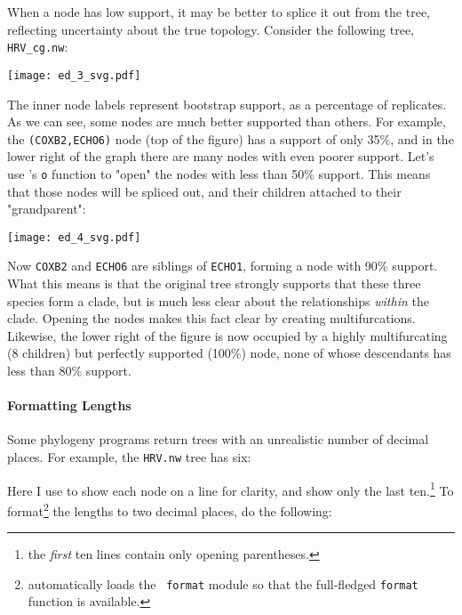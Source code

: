 When a node has low support, it may be better to splice it out from the tree,
reflecting uncertainty about the true topology. Consider the following tree, 
\texttt{HRV\_cg.nw}:

\begin{center}
\texttt{[image: ed\_3\_svg.pdf]}
\end{center}

\noindent{}The inner node labels represent bootstrap support, as a percentage of
replicates. As we can see, some nodes are much better supported than others.
For example, the \texttt{(COXB2,ECHO6)} node (top of the figure) has a support
of only 35\%, and in the lower right of the graph there are many nodes with even
poorer support. Let's use \luaed's \texttt{o} function to "open" the nodes with
less than 50\% support. This means that those nodes will be spliced out, and
their children attached to their "grandparent":


\begin{center}
\texttt{[image: ed\_4\_svg.pdf]}
\end{center}

\noindent{}Now \texttt{COXB2} and \texttt{ECHO6} are siblings of
\texttt{ECHO1}, forming a node with 90\% support. What this means is that the
original tree strongly supports that these three species form a clade, but is
much less clear about the relationships \emph{within} the clade. Opening the
nodes makes this fact clear by creating multifurcations. Likewise, the lower
right of the figure is now occupied by a highly multifurcating (8 children) but
perfectly supported (100\%) node, none of whose descendants has less than 80\%
support.


\paragraph{Formatting Lengths} 

\noindent{}Some phylogeny programs return \nw{} trees with an unrealistic number
of decimal places. For example, the \texttt{HRV.nw} tree has six:


\begin{samepage}

\end{samepage}

\noindent{}Here I use \nwindent{} to show each node on a line for clarity, and
show only the last ten.\footnote{the \emph{first} ten lines contain only
opening parentheses.} To format\footnote{\sched{} automatically loads the {\tt
format} module so that the full-fledged {\tt format} function is available.}
the lengths to two decimal places, do the following:

